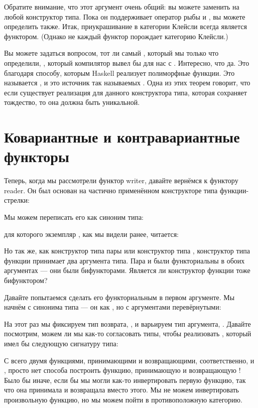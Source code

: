 Обратите внимание, что этот аргумент очень общий: вы можете заменить
 на любой конструктор типа. Пока он поддерживает оператор рыбы
и , вы можете определить  также. Итак,
приукрашивание в категории Клейсли всегда является функтором. (Однако не
каждый функтор порождает категорию Клейсли.)

Вы можете задаться вопросом, тот ли самый , который мы только что определили,
, который компилятор вывел бы для нас с
. Интересно, что да. Это благодаря
способу, которым Haskell реализует полиморфные функции. Это называется
, и это источник так называемых
. Одна из этих теорем говорит, что если существует
реализация  для данного конструктора типа, которая
сохраняет тождество, то она должна быть уникальной.

\section{Ковариантные и контравариантные функторы}

Теперь, когда мы рассмотрели функтор writer, давайте вернёмся к функтору reader.
Он был основан на частично применённом конструкторе типа функции-стрелки:

Мы можем переписать его как синоним типа:

для которого экземпляр , как мы видели ранее, читается:

Но так же, как конструктор типа пары или конструктор типа ,
конструктор типа функции принимает два аргумента типа.
Пара и  были функториальны в обоих аргументах --- они были
бифункторами. Является ли конструктор функции тоже бифунктором?

Давайте попытаемся сделать его функториальным в первом аргументе. Мы начнём с
синонима типа --- он как , но с
аргументами перевёрнутыми:

На этот раз мы фиксируем тип возврата, , и варьируем тип аргумента,
. Давайте посмотрим, можем ли мы как-то согласовать типы, чтобы
реализовать , который имел бы следующую сигнатуру
типа:

С всего двумя функциями, принимающими  и возвращающими, соответственно,
 и , просто нет способа построить функцию,
принимающую  и возвращающую ! Было бы иначе, если бы мы
могли как-то инвертировать первую функцию, так что она принимала  и
возвращала  вместо этого. Мы не можем инвертировать произвольную функцию, но
мы можем пойти в противоположную категорию.

